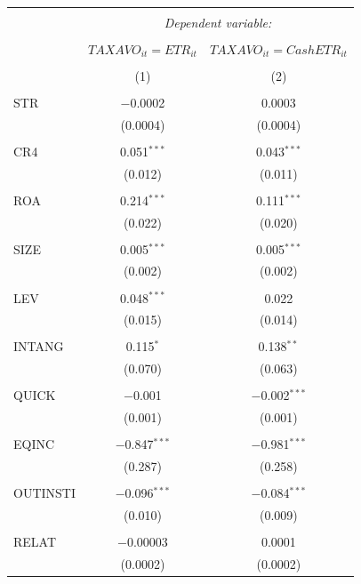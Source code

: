 \documentclass[a4paper]{article}\usepackage[]{graphicx}\usepackage[]{color}
\begin{document}
\begin{table}[!htbp] \centering 
  \caption{} 
  \label{F4} 
\begin{tabular}{@{\extracolsep{5pt}}lcc} 
\\[-1.8ex]\hline 
\hline \\[-1.8ex] 
 & \multicolumn{2}{c}{\textit{Dependent variable:}} \\ 
\cline{2-3} 
\\[-1.8ex] & $TAXAVO_{it}=ETR_{it}$ & $TAXAVO_{it}=CashETR_{it}$ \\ 
\\[-1.8ex] & (1) & (2)\\ 
\hline \\[-1.8ex] 
 STR & $-$0.0002 & 0.0003 \\ 
  & (0.0004) & (0.0004) \\ 
  & & \\ 
 CR4 & 0.051$^{***}$ & 0.043$^{***}$ \\ 
  & (0.012) & (0.011) \\ 
  & & \\ 
 ROA & 0.214$^{***}$ & 0.111$^{***}$ \\ 
  & (0.022) & (0.020) \\ 
  & & \\ 
 SIZE & 0.005$^{***}$ & 0.005$^{***}$ \\ 
  & (0.002) & (0.002) \\ 
  & & \\ 
 LEV & 0.048$^{***}$ & 0.022 \\ 
  & (0.015) & (0.014) \\ 
  & & \\ 
 INTANG & 0.115$^{*}$ & 0.138$^{**}$ \\ 
  & (0.070) & (0.063) \\ 
  & & \\ 
 QUICK & $-$0.001 & $-$0.002$^{***}$ \\ 
  & (0.001) & (0.001) \\ 
  & & \\ 
 EQINC & $-$0.847$^{***}$ & $-$0.981$^{***}$ \\ 
  & (0.287) & (0.258) \\ 
  & & \\ 
 OUTINSTI & $-$0.096$^{***}$ & $-$0.084$^{***}$ \\ 
  & (0.010) & (0.009) \\ 
  & & \\ 
 RELAT & $-$0.00003 & 0.0001 \\ 
  & (0.0002) & (0.0002) \\ 

\end{tabular}
\end{table}
\end{document}
